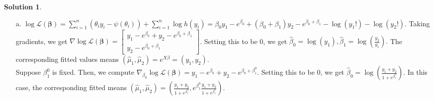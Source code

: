 \documentclass[11pt,letterpaper,english,oneside]{article}\usepackage[]{graphicx}\usepackage[]{color}
\theoremstyle{definition} %
\newtheorem{solution}{Solution}
\newenvironment{sol}{\begin{solution}\hspace{0pt}}{\end{solution}}
\begin{document}
\begin{sol}
\begin{enumerate}
    \item[a.]
    $\log \mathcal L(\bm \beta) = \sum_{i = 1}^n (\theta_i y_i - \psi(\theta_i)) + \sum_{i = 1}^n \log h(y_i) 
    = \beta_0y_1 - e^{\beta_0} + (\beta_0+\beta_1)y_2 - e^{\beta_0+\beta_1}  - \log(y_1!) -\log(y_2!).$    Taking gradients, we get $\nabla \log \mathcal L(\bm \beta) =
    \begin{bmatrix}
    y_1-e^{\beta_0} + y_2 - e^{\beta_0+\beta_1} \\
    y_2 - e^{\beta_0+\beta_1}
    \end{bmatrix}$. Setting this to be 0, we get $\hat{\beta}_0 = \log(y_1), \hat{\beta}_1 = \log(\frac{y_2}{y_1}).$ The corresponding fitted values means $(\hat{\mu}_1, \hat{\mu}_2) = e^{X\beta}= (y_1, y_2)$.\\
    
    Suppose $\beta_1^0$ is fixed. Then, we compute $\nabla_{\beta_0} \log \mathcal L(\bm \beta) =y_1-e^{\beta_0} + y_2 - e^{\beta_0+\beta_1^0}$. Setting this to be 0, we get $\hat{\beta}_0 = \log(\frac{y_1+y_2}{1+e^{\beta_1^0}}).$    In this case, the corresponding fitted means $(\hat{\mu}_1, \hat{\mu}_2) = (\frac{y_1+y_2}{1+e^{\beta_1^0}}, e^{\beta_1^0}\frac{y_1+y_2}{1+e^{\beta_1^0}})$.\\
    

\end{enumerate}
\end{sol}
\end{document}
